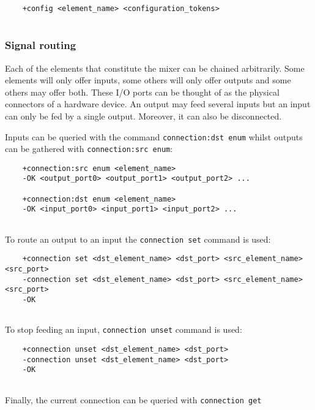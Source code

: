 \documentclass[../main.tex]{subfiles}
\begin{document}
\begin{lstlisting}
    +config <element_name> <configuration_tokens>
    
\end{lstlisting}


\subsubsection{Signal routing}

Each of the elements that constitute the mixer can be chained arbitrarily. Some elements will only offer inputs, some others will only offer outputs and some others may offer both. These I/O ports can be thought of as the physical connectors of a hardware device. An output may feed several inputs but an input can only be fed by a single output. Moreover, it can also be disconnected.\newline

Inputs can be queried with the command \texttt{connection:dst enum} whilst outputs can be gathered with \texttt{connection:src enum}:

\begin{lstlisting}
    +connection:src enum <element_name>
    -OK <output_port0> <output_port1> <output_port2> ...
    
    +connection:dst enum <element_name>
    -OK <input_port0> <input_port1> <input_port2> ...
    
\end{lstlisting}

To route an output to an input the \texttt{connection set} command is used:

\begin{lstlisting}
    +connection set <dst_element_name> <dst_port> <src_element_name> <src_port>
    -connection set <dst_element_name> <dst_port> <src_element_name> <src_port>
    -OK
    
\end{lstlisting}


To stop feeding an input, \texttt{connection unset} command is used:

\begin{lstlisting}
    +connection unset <dst_element_name> <dst_port>
    -connection unset <dst_element_name> <dst_port>
    -OK
    
\end{lstlisting}

Finally, the current connection can be queried with \texttt{connection get}
\end{document}
